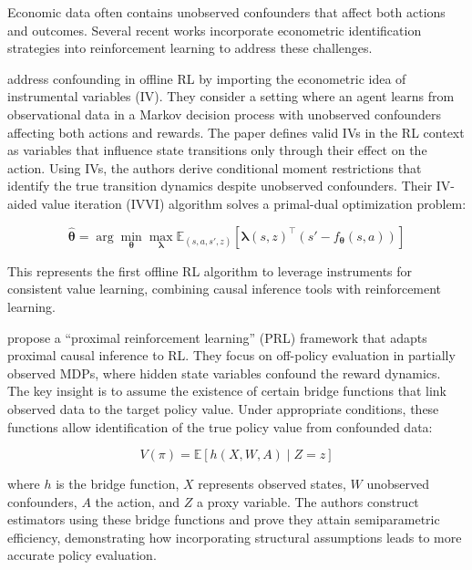 Economic data often contains unobserved confounders that affect both actions and outcomes. Several recent works incorporate econometric identification strategies into reinforcement learning to address these challenges.

\citet{liao2024} address confounding in offline RL by importing the econometric idea of instrumental variables (IV). They consider a setting where an agent learns from observational data in a Markov decision process with unobserved confounders affecting both actions and rewards. The paper defines valid IVs in the RL context as variables that influence state transitions only through their effect on the action. Using IVs, the authors derive conditional moment restrictions that identify the true transition dynamics despite unobserved confounders. Their IV-aided value iteration (IVVI) algorithm solves a primal-dual optimization problem:

\begin{equation}
\hat{\boldsymbol{\theta}} = \arg\min_{\boldsymbol{\theta}} \max_{\boldsymbol{\lambda}} \mathbb{E}_{(s,a,s',z)}\left[\boldsymbol{\lambda}(s,z)^{\top}(s' - f_{\boldsymbol{\theta}}(s,a))\right]
\end{equation}

This represents the first offline RL algorithm to leverage instruments for consistent value learning, combining causal inference tools with reinforcement learning.

\citet{BennettKallus2023} propose a ``proximal reinforcement learning'' (PRL) framework that adapts proximal causal inference to RL. They focus on off-policy evaluation in partially observed MDPs, where hidden state variables confound the reward dynamics. The key insight is to assume the existence of certain bridge functions that link observed data to the target policy value. Under appropriate conditions, these functions allow identification of the true policy value from confounded data:

\begin{equation}
V(\pi) = \mathbb{E}\left[h(X, W, A) \mid Z=z\right]
\end{equation}

where $h$ is the bridge function, $X$ represents observed states, $W$ unobserved confounders, $A$ the action, and $Z$ a proxy variable. The authors construct estimators using these bridge functions and prove they attain semiparametric efficiency, demonstrating how incorporating structural assumptions leads to more accurate policy evaluation.


